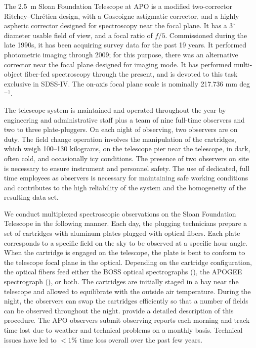 The 2.5~m Sloan Foundation Telescope at APO is a modified
two-corrector Ritchey--Chr{\'e}tien design, with a Gascoigne
astigmatic corrector, and a highly aspheric corrector designed for
spectroscopy near the focal plane.  It has a 3$^\circ$ diameter usable
field of view, and a focal ratio of $f/5$.  Commissioned during the
late 1990s, it has been acquiring survey data for the past 19 years.
It performed photometric imaging through 2009; for this purpose, there
was an alternative corrector near the focal plane designed for imaging
mode. It has performed multi-object fiber-fed spectroscopy through the
present, and is devoted to this task exclusive in SDSS-IV. The on-axis
focal plane scale is nominally 217.736 mm deg$^{-1}$.

The telescope system is maintained and operated throughout the year by
engineering and administrative staff plus a team of nine full-time
observers and two to three plate-pluggers.  On each night of
observing, two observers are on duty. The field change operation
involves the manipulation of the cartridges, which weigh 100--130
kilograms, on the telescope pier near the telescope, in dark, often
cold, and occasionally icy conditions. The presence of two observers
on site is necessary to ensure instrument and personnel safety. The
use of dedicated, full time employees as observers is necessary for
maintaining safe working conditions and contributes to the high
reliability of the system and the homogeneity of the resulting data
set.

We conduct multiplexed spectroscopic observations on the Sloan
Foundation Telescope in the following manner. Each day, the plugging
technicians prepare a set of cartridges with aluminum plates plugged
with optical fibers. Each plate corresponds to a specific field on the
sky to be observed at a specific hour angle. When the cartridge is
engaged on the telescope, the plate is bent to conform to the
telescope focal plane in the optical. Depending on the cartridge
configuration, the optical fibers feed either the BOSS optical
spectrographs (\citealt{smee13a}), the APOGEE spectrograph
(\citealt{wilson12a}), or both. The cartridges are initially staged in
a bay near the telescope and allowed to equilibrate with the outside
air temperature. During the night, the observers can swap the
cartridges efficiently so that a number of fields can be observed
throughout the night. \citet{dawson13a} provide a detailed description
of this procedure.  The APO observers submit observing reports each
morning and track time lost due to weather and technical problems on a
monthly basis. Technical issues have led to $<1\%$ time loss overall
over the past few years.

